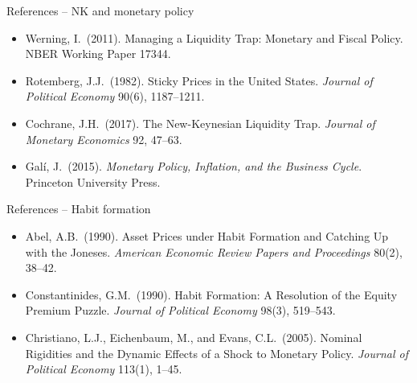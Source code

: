 \documentclass[11pt,aspectratio=169]{beamer}
\begin{document}
\begin{frame}{References -- NK and monetary policy}

\begin{itemize}

\item Werning, I.\ (2011). Managing a Liquidity Trap: Monetary and
  Fiscal Policy. NBER Working Paper 17344.\newline

\item Rotemberg, J.J.\ (1982). Sticky Prices in the United States.
  \emph{Journal of Political Economy} 90(6), 1187--1211.\newline

\item Cochrane, J.H.\ (2017). The New-Keynesian Liquidity Trap.
  \emph{Journal of Monetary Economics} 92, 47--63.\newline

\item Gal\'i, J.\ (2015). \emph{Monetary Policy, Inflation, and the
  Business Cycle}. Princeton University Press.

\end{itemize}

\end{frame}

\begin{frame}{References -- Habit formation}

\begin{itemize}

\item Abel, A.B.\ (1990). Asset Prices under Habit Formation and
  Catching Up with the Joneses. \emph{American Economic Review Papers
  and Proceedings} 80(2), 38--42.\newline

\item Constantinides, G.M.\ (1990). Habit Formation: A Resolution of
  the Equity Premium Puzzle. \emph{Journal of Political Economy}
  98(3), 519--543.\newline

\item Christiano, L.J., Eichenbaum, M., and Evans, C.L.\ (2005).
  Nominal Rigidities and the Dynamic Effects of a Shock to Monetary
  Policy. \emph{Journal of Political Economy} 113(1), 1--45.

\end{itemize}

\end{frame}
\end{document}
